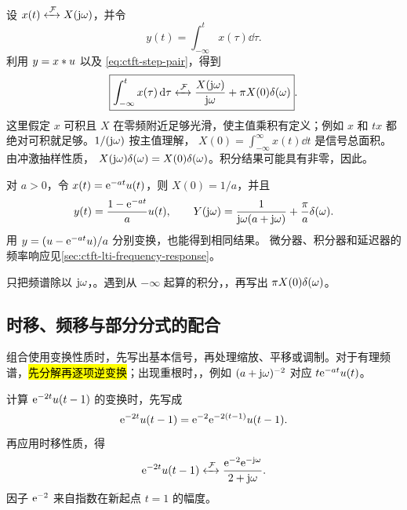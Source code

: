 设
$x(t)\mathrel{\xleftrightarrow{\,\mathcal{F}\,}} X(\mathrm{j}\omega)$，并令
\[
  y(t)=\int_{-\infty}^{t}x(\tau)\dd\tau.
\]
利用 $y=x\mathbin{\ast}u$ 以及
\cref{eq:ctft-step-pair}，得到
\begin{equation}
  \boxed{\int_{-\infty}^{t}x(\tau)\mathop{}\!\mathrm{d}\tau
  \mathrel{\xleftrightarrow{\,\mathcal{F}\,}}
  \frac{X(\mathrm{j}\omega)}{\mathrm{j}\omega}
  +\pi X(0)\delta(\omega)}.
  \label{eq:ctft-integration-property}
\end{equation}
这里假定 $x$ 可积且 $X$ 在零频附近足够光滑，使主值乘积有定义；例如 $x$ 和 $t x$ 都绝对可积就足够。$1/(\mathrm{j}\omega)$ 按主值理解，
$X(0)=\int_{-\infty}^{\infty}x(t)\dd t$ 是信号总面积。由冲激抽样性质，
$X(\mathrm{j}\omega)\delta(\omega)=X(0)\delta(\omega)$。积分结果可能具有非零，因此。

\begin{example}[指数信号的累积积分]
  \label{eg:ctft-integrated-exponential}
  对 $a>0$，令 $x(t)=\mathrm{e}^{-at}u(t)$，则 $X(0)=1/a$，并且
  \[
    y(t)=\frac{1-\mathrm{e}^{-at}}{a}u(t),\qquad
    Y(\mathrm{j}\omega)=\frac{1}{\mathrm{j}\omega(a+\mathrm{j}\omega)}
      +\frac{\pi}{a}\delta(\omega).
  \]
  用 $y=(u-\mathrm{e}^{-at}u)/a$ 分别变换，也能得到相同结果。
  微分器、积分器和延迟器的频率响应见\cref{sec:ctft-lti-frequency-response}。
\end{example}

\begin{pitfall}[积分时漏掉零频冲激]
  只把频谱除以 $\mathrm{j}\omega$，。遇到从 $-\infty$ 起算的积分，，再写出 $\pi X(0)\delta(\omega)$。
\end{pitfall}

\subsection{时移、频移与部分分式的配合}

组合使用变换性质时，先写出基本信号，再处理缩放、平移或调制。对于有理频谱，\hl{先分解再逐项逆变换}；出现重根时，，例如 $(a+\mathrm{j}\omega)^{-2}$ 对应 $t\mathrm{e}^{-at}u(t)$。

\begin{example}[阶跃起点与指数起点不同]
  \label{eg:ctft-delayed-exponential-window}
  计算 $\mathrm{e}^{-2t}u(t-1)$ 的变换时，先写成
  \[
    \mathrm{e}^{-2t}u(t-1)
    =\mathrm{e}^{-2}\mathrm{e}^{-2(t-1)}u(t-1).
  \]
  再应用时移性质，得
  \[
    \mathrm{e}^{-2t}u(t-1)
    \mathrel{\xleftrightarrow{\,\mathcal{F}\,}}
    \frac{\mathrm{e}^{-2}\mathrm{e}^{-\mathrm{j}\omega}}{2+\mathrm{j}\omega}.
  \]
  因子 $\mathrm{e}^{-2}$ 来自指数在新起点 $t=1$ 的幅度。
\end{example}

